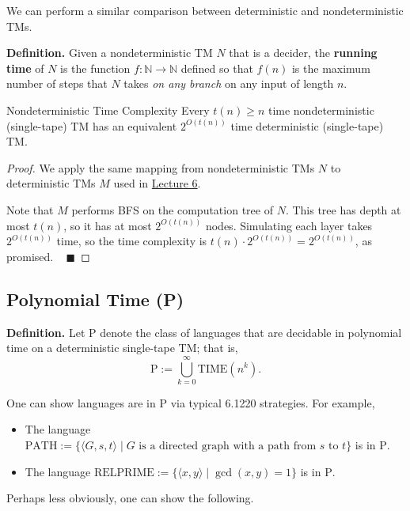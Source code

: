 We can perform a similar comparison between
deterministic and nondeterministic TMs.

\textbf{Definition.}
Given a nondeterministic TM $N$ that is a decider,
the \textbf{running time} of $N$ is the function
$f \colon \mathbb{N} \to \mathbb{N}$ defined so that
$f(n)$ is the maximum number of steps that $N$ takes
\emph{on any branch} on any input of length $n$.

\begin{theorem}{Nondeterministic Time Complexity}
    Every $t(n) \geq n$ time nondeterministic (single-tape) TM
    has an equivalent $2^{O(t(n))}$ time deterministic (single-tape) TM.
\end{theorem}

\begin{proof}
    We apply the same mapping from
    nondeterministic TMs $N$ to deterministic TMs $M$
    used in \href{/18.404/lectures/6/#nondeterministic-turing-machines}{Lecture 6}.

    Note that $M$ performs BFS on
    the computation tree of $N$.
    This tree has depth at most $t(n)$,
    so it has at most $2^{O(t(n))}$ nodes.
    Simulating each layer takes $2^{O(t(n))}$ time,
    so the time complexity is $t(n) \cdot 2^{O(t(n))} = 2^{O(t(n))}$,
    as promised. ~ $\blacksquare$
\end{proof}

\subsection{Polynomial Time (P)}

\textbf{Definition.}
Let $\mathrm{P}$ denote the class of languages that are decidable
in polynomial time on a deterministic single-tape TM; that is,
\[ \mathrm{P} := \bigcup_{k = 0}^{\infty} \mathrm{TIME}(n^k). \]

One can show languages are in $\mathrm{P}$ via
typical 6.1220 strategies.  For example,
\begin{itemize}
    \item The language $\mathrm{PATH} := \{
        \langle G, s, t \rangle \mid
        G \text{ is a directed graph with a path from } s \text{ to } t
    \}$ is in $\mathrm{P}$.
    \item The language $\mathrm{RELPRIME} := \{
        \langle x, y \rangle \mid \gcd(x, y) = 1
    \}$ is in $\mathrm{P}$.
\end{itemize}

Perhaps less obviously, one can show the following.

